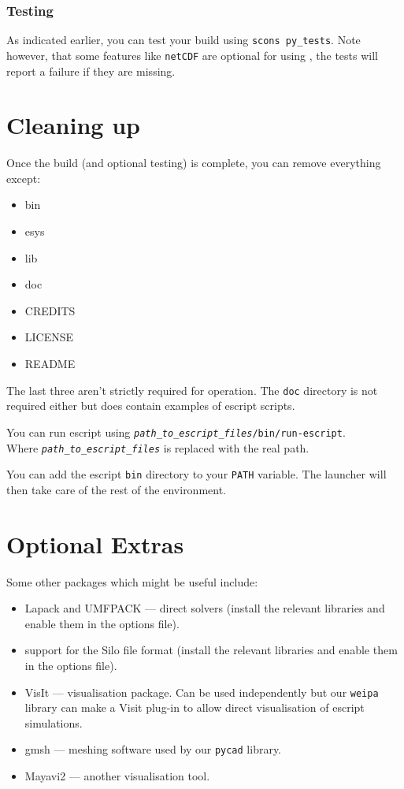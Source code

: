 \documentclass{esysdoc}
\begin{document}
\subsubsection{Testing}
As indicated earlier, you can test your build using \texttt{scons py_tests}.
Note however, that some features like \texttt{netCDF} are optional for using \escript, the tests will report a failure if
they are missing.

\section{Cleaning up}
\label{sec:cleanup}

Once the build (and optional testing) is complete, you can remove everything except:
\begin{itemize}
 \item bin
 \item esys
 \item lib
 \item doc
 \item CREDITS
 \item LICENSE
 \item README
\end{itemize}
The last three aren't strictly required for operation.
The \texttt{doc} directory is not required either but does contain examples of escript scripts.

You can run escript using \texttt{\textit{path_to_escript_files}/bin/run-escript}.\\
Where \texttt{\textit{path_to_escript_files}} is replaced with the real path.

\begin{optionalstep}
You can add the escript \texttt{bin} directory to your \texttt{PATH} variable.
The launcher will then take care of the rest of the environment.
\end{optionalstep}

\section{Optional Extras}

Some other packages which might be useful include:
\begin{itemize}
 \item Lapack and UMFPACK --- direct solvers (install the relevant libraries and enable them in the options file).
 \item support for the Silo file format (install the relevant libraries and enable them in the options file).
 \item VisIt --- visualisation package. Can be used independently but our \texttt{weipa} library can make a Visit
plug-in to allow direct visualisation of escript simulations.
 \item gmsh --- meshing software used by our \texttt{pycad} library.
 \item Mayavi2 --- another visualisation tool.
\end{itemize}
\end{document}
